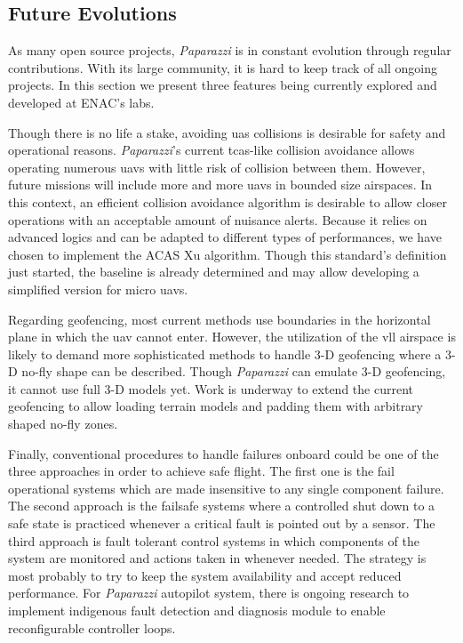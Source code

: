\subsection{Future Evolutions}
	As many open source projects, \emph{Paparazzi} is in constant evolution through regular contributions. With its large community, it is hard to keep track of all ongoing projects. In this section we present three features being currently explored and developed at ENAC's labs. 

	Though there is no life a stake, avoiding \gls{uas} collisions is desirable for safety and operational reasons. 
	 \emph{Paparazzi}'s current \gls{tcas}-like collision avoidance allows operating numerous \gls{uav}s with little risk of collision between them. However, future missions will include more and more \gls{uav}s in bounded size airspaces.
	 In this context, an efficient collision avoidance algorithm is desirable to allow closer operations with an acceptable amount of nuisance alerts. 
	 Because it relies on advanced logics and can be adapted to different types of performances, we have chosen to implement the ACAS Xu algorithm. Though this standard's definition just started, the baseline is already determined and may allow developing a simplified version for micro \gls{uav}s. 

	Regarding geofencing, most current methods use boundaries in the horizontal plane in which the \gls{uav} cannot enter. However, the utilization of the \gls{vll} airspace is likely to demand more sophisticated methods to handle 3-D geofencing where a 3-D no-fly shape can be described.
	Though \emph{Paparazzi} can emulate 3-D geofencing, it cannot use full 3-D models yet. Work is underway to extend the current geofencing to allow loading terrain models and padding them with arbitrary shaped no-fly zones.

	Finally, conventional procedures to handle failures onboard could be one of the three approaches in order to achieve safe flight. The first one is the fail operational systems which are made insensitive to any single component failure. The second approach is the failsafe systems where a controlled shut down to a safe state is practiced whenever a critical fault is pointed out by a sensor. The third approach is fault tolerant control systems in which components of the system are monitored and actions taken in whenever needed. The strategy is most probably to try to keep the system availability and accept reduced performance. For \emph{Paparazzi} autopilot system, there is ongoing research to implement indigenous fault detection and diagnosis module to enable reconfigurable controller loops. 
	
